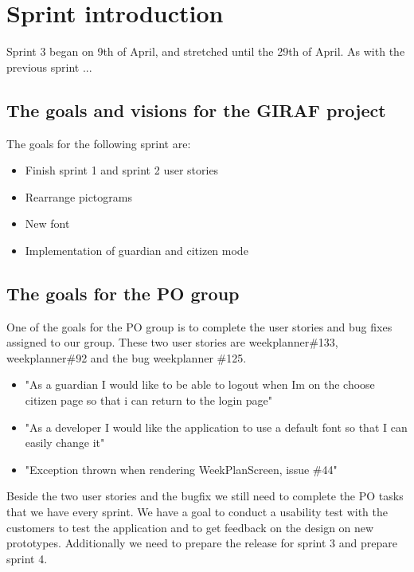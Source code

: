 \section{Sprint introduction}
Sprint 3 began on 9th of April, and stretched until the 29th of April.
As with the previous sprint ...

\subsection{The goals and visions for the GIRAF project}
The goals for the following sprint are:

\begin{itemize}
    \item Finish sprint 1 and sprint 2 user stories
    \item Rearrange pictograms
    \item New font
    \item Implementation of guardian and citizen mode
\end{itemize}



\subsection{The goals for the PO group}
One of the goals for the PO group is to complete the user stories and bug fixes assigned to our group.
These two user stories are weekplanner\#133, weekplanner\#92 and the bug weekplanner \#125.

\begin{itemize}
    \item "As a guardian I would like to be able to logout when Im on the choose citizen page so that i can return to the login page"
    \item "As a developer I would like the application to use a default font so that I can easily change it"
    \item "Exception thrown when rendering WeekPlanScreen, issue \#44"
\end{itemize}
\noindent
Beside the two user stories and the bugfix we still need to complete the PO tasks that we have every sprint.
We have a goal to conduct a usability test with the customers to test the application and to get feedback on the design on new prototypes.
Additionally we need to prepare the release for sprint 3 and prepare sprint 4.

